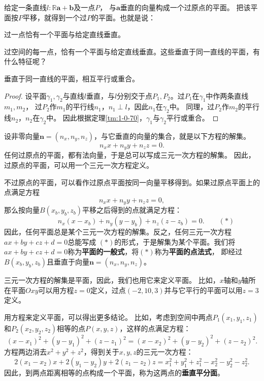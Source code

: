 \documentclass[12pt,UTF8]{ctexbook}
\begin{document}
给定一条直线$l:\mathbb{R}\mathbf{a} + \mathbf{b}$及一点$P$，
与$\mathbf{a}$垂直的向量构成一个过原点的平面。
把该平面按$P$平移，就得到一个过$P$的平面。也就是说：
\begin{tm}\label{tm:1-3-70}
    过一点恰有一个平面与给定直线垂直。
\end{tm}

过空间的每一点，恰有一个平面与给定直线垂直。这些垂直于同一直线的平面，有什么特征呢？
\begin{tm}\label{tm:1-3-80}
    垂直于同一直线的平面，相互平行或重合。
\end{tm}
\begin{proof}
    设平面$\gamma_1,\gamma_2$与直线$l$垂直，与$l$分别交于点$P_1,P_2$。过$P_1$在$\gamma_1$中作两条直线$m_1,m_2$，
    过$P_2$作$m_1$的平行线$n_1$，$n_1\perp l$，因此$n_1$在$\gamma_2$中。
    同理，过$P_2$作$m_2$的平行线$n_2$，$n_2$在$\gamma_2$中。
    因此根据定理\ref{tm:1-0-70}，$\gamma_1$与$\gamma_2$平行或重合。
\end{proof}

设非零向量$\mathbf{n} = (n_x, n_y, n_z)$，与它垂直的向量的集合，就是以下方程的解集。
$$ n_xx + n_yy + n_zz = 0. $$
任何过原点的平面，都有法向量，于是总可以写成三元一次方程的解集。
因此，过原点的平面，可以用一个三元一次方程定义。

不过原点的平面，可以看作过原点平面按同一向量平移得到。如果过原点平面上的点满足方程
$$ n_xx + n_yy + n_zz = 0, $$
那么按向量$B(x_b, y_b,z_b)$平移之后得到的点就满足方程：
$$ \mbox{}\qquad\qquad n_x(x - x_b) + n_y(y - y_b) + n_z(z - z_b) = 0. \quad\quad (*)$$
因此，任何平面总是某个三元一次方程的解集。反之，任何三元一次方程$ax+by+cz+d = 0$总能写成
$(*)$的形式，于是解集为某个平面。我们将$ax+by+cz+d = 0$称为\textbf{平面的一般式}，将$(*)$称为\textbf{平面的点法式}，
即经过$B(x_b, y_b,z_b)$且垂直于向量$\mathbf{n} = (n_x, n_y, n_z)$。

三元一次方程的解集是平面，因此，我们也用它来定义平面。
比如，$x$轴和$y$轴所在平面$Oxy$可以用方程$z = 0$定义，过点$(-2,10,3)$并与它平行的平面可以用$z = 3$定义。	

用方程来定义平面，可以得出更多结论。
比如，考虑到空间中两点$P_1(x_1, y_1, z_1)$和$P_2(x_2, y_2, z_2)$相等的点$P(x,y,z)$，这样的点满足方程：
$$ (x - x_1)^2 + (y - y_1)^2 + (z - z_1)^2 = (x - x_2)^2 + (y - y_2)^2 + (z - z_2)^2. $$
方程两边消去$x^2 + y^2 + z^2$，得到关于$x,y,z$的三元一次方程：
$$ 2(x_1-x_2)x + 2(y_1-y_2)y + 2(z_1-z_2)z = x_1^2+y_1^2+z_1^2 - x_2^2-y_2^2-z_2^2. $$
因此，到两点距离相等的点构成一个平面，称为这两点的\textbf{垂直平分面}。
\end{document}
